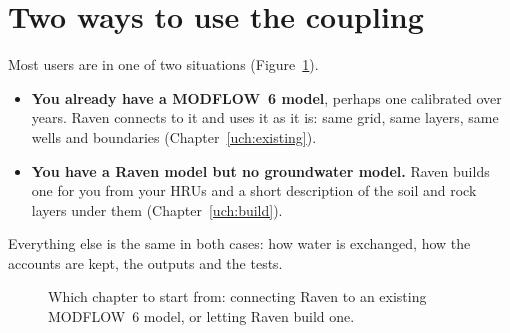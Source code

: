\section{Two ways to use the coupling}\label{sec:twoways}
Most users are in one of two situations (Figure~\ref{fig:twoways}).
\begin{itemize}
\item \textbf{You already have a MODFLOW~6 model}, perhaps one calibrated over years. Raven connects to it and uses it as
      it is: same grid, same layers, same wells and boundaries (Chapter~\ref{uch:existing}).
\item \textbf{You have a Raven model but no groundwater model.} Raven builds one for you from your HRUs and a short
      description of the soil and rock layers under them (Chapter~\ref{uch:build}).
\end{itemize}
Everything else is the same in both cases: how water is exchanged, how the accounts are kept, the outputs and the tests.

\begin{figure}[!htbp]\centering
\caption{Which chapter to start from: connecting Raven to an existing MODFLOW~6 model, or letting Raven build one.}\label{fig:twoways}
\end{figure}

